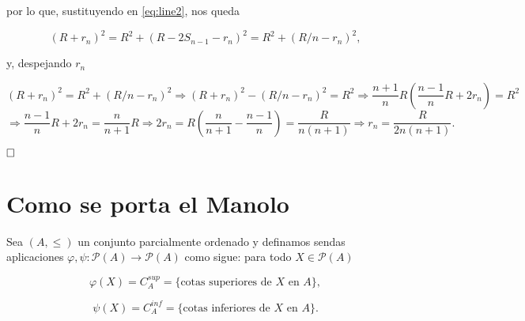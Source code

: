 \documentclass{article}
\begin{document}
\noindent por lo que, sustituyendo en \eqref{eq:line2}, nos queda

\[(R + r_n)^2 = R^2 + (R - 2S_{n-1} - r_n)^2 = R^2 + (R/n - r_n)^2,\]

\noindent y, despejando $r_n$

\[(R + r_n)^2 = R^2 + (R/n - r_n)^2 \Rightarrow (R + r_n)^2 - (R/n - r_n)^2 = R^2 \Rightarrow \frac{n + 1}{n}R\left(\frac{n-1}{n}R + 2r_n\right) = R^2\] 
\[\Rightarrow \frac{n-1}{n}R + 2r_n = \frac{n}{n+1}R \Rightarrow 2r_n = R\left(\frac{n}{n+1} - \frac{n - 1}{n}\right) = \frac{R}{n(n+1)} \Rightarrow r_n = \frac{R}{2n(n+1)}.\]

$\hfill\square$

\newpage

\section{Como se porta el Manolo}

Sea $(A, \leq)$ un conjunto parcialmente ordenado y definamos sendas aplicaciones $\varphi, \psi : \mathcal{P}(A) \rightarrow \mathcal{P}(A)$ como sigue: para todo $X \in \mathcal{P}(A)$

\[\varphi(X) = C_A^{sup} = \{\text{cotas superiores de $X$ en $A$}\},\]

\[\psi(X) = C_A^{inf} = \{\text{cotas inferiores de $X$ en $A$}\}.\]
\end{document}
